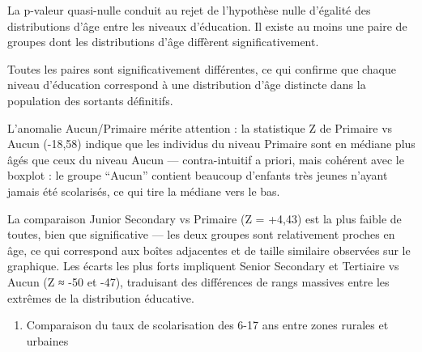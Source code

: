 \documentclass[
]{article}
\providecommand{\tightlist}{%
  \setlength{\itemsep}{0pt}\setlength{\parskip}{0pt}}
\begin{document}
La p-valeur quasi-nulle conduit au rejet de l'hypothèse nulle d'égalité
des distributions d'âge entre les niveaux d'éducation. Il existe au
moins une paire de groupes dont les distributions d'âge diffèrent
significativement.

Toutes les paires sont significativement différentes, ce qui confirme
que chaque niveau d'éducation correspond à une distribution d'âge
distincte dans la population des sortants définitifs.

L'anomalie Aucun/Primaire mérite attention : la statistique Z de
Primaire vs Aucun (-18,58) indique que les individus du niveau Primaire
sont en médiane plus âgés que ceux du niveau Aucun --- contra-intuitif a
priori, mais cohérent avec le boxplot : le groupe ``Aucun'' contient
beaucoup d'enfants très jeunes n'ayant jamais été scolarisés, ce qui
tire la médiane vers le bas.

La comparaison Junior Secondary vs Primaire (Z = +4,43) est la plus
faible de toutes, bien que significative --- les deux groupes sont
relativement proches en âge, ce qui correspond aux boîtes adjacentes et
de taille similaire observées sur le graphique. Les écarts les plus
forts impliquent Senior Secondary et Tertiaire vs Aucun (Z ≈ -50 et
-47), traduisant des différences de rangs massives entre les extrêmes de
la distribution éducative.

\begin{enumerate}
\def\labelenumi{\arabic{enumi}.}
\setcounter{enumi}{10}
\tightlist
\item
  Comparaison du taux de scolarisation des 6-17 ans entre zones rurales
  et urbaines
\end{enumerate}
\end{document}
